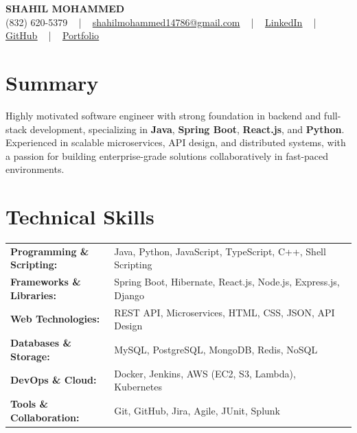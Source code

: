 \documentclass[letterpaper,11pt]{article}
\begin{document}
\begin{center}
    {\fontsize{14pt}{12pt}\selectfont \textbf{\MakeUppercase{Shahil Mohammed}}}\\ \vspace{2pt}
    \fontsize{10pt}{12pt}\selectfont (832) 620-5379 ~ | ~ \href{mailto:shahilmohammed14786@gmail.com}{shahilmohammed14786@gmail.com} ~ | ~  
    \href{https://www.linkedin.com/in/shahil-mohammed-9652931a1/}{\color{blue}\underline{LinkedIn}}  ~ | ~ 
    \href{https://github.com/freakbeast14}{\color{blue}\underline{GitHub}} ~ | ~ 
    \href{https://shahil-mohammed.netlify.app/}{\color{blue}\underline{Portfolio}}
    \vspace{-8pt}
\end{center}

\section{Summary}
\fontsize{9pt}{10pt}\selectfont
Highly motivated software engineer with strong foundation in backend and full-stack development, specializing in \textbf{Java}, \textbf{Spring Boot}, \textbf{React.js}, and \textbf{Python}. Experienced in scalable microservices, API design, and distributed systems, with a passion for building enterprise-grade solutions collaboratively in fast-paced environments.
 \vspace{-5pt}
 
\section{Technical Skills}
        \vspace{-14pt}
        \begin{table}[h]
            \fontsize{9pt}{10pt}\selectfont
            \begin{tabular}{p{0.3\linewidth} p{0.7\linewidth}}
                \textbf{Programming \& Scripting:} & Java, Python, JavaScript, TypeScript, C++, Shell Scripting \\
                \textbf{Frameworks \& Libraries:} & Spring Boot, Hibernate, React.js, Node.js, Express.js, Django \\
                \textbf{Web Technologies:} & REST API, Microservices, HTML, CSS, JSON, API Design \\
                \textbf{Databases \& Storage:} & MySQL, PostgreSQL, MongoDB, Redis, NoSQL \\
                \textbf{DevOps \& Cloud:} & Docker, Jenkins, AWS (EC2, S3, Lambda), Kubernetes \\
                \textbf{Tools \& Collaboration:} & Git, GitHub, Jira, Agile, JUnit, Splunk \\
            \end{tabular}
        \end{table}
 \vspace{-15pt}
 
\end{document}
